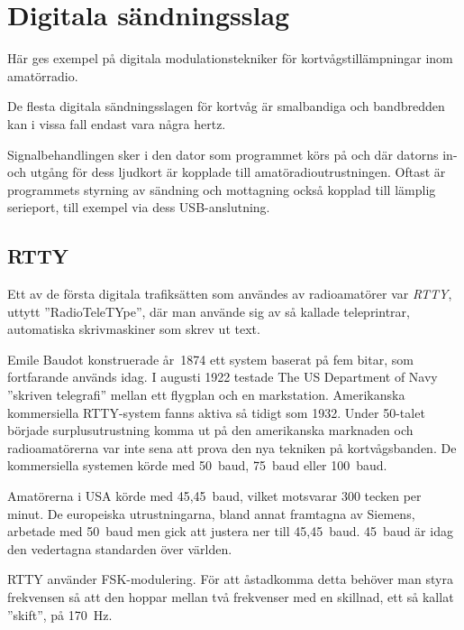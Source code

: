 \section{Digitala sändningsslag}

Här ges exempel på digitala modulationstekniker för kortvågstillämpningar inom
amatörradio.

De flesta digitala sändningsslagen för kortvåg är smalbandiga och bandbredden
kan i vissa fall endast vara några hertz.

Signalbehandlingen sker i den dator som programmet körs på och där datorns
in- och utgång för dess ljudkort är kopplade till amatöradioutrustningen.
Oftast är programmets styrning av sändning och mottagning också kopplad till
lämplig serieport, till exempel via dess USB-anslutning.

\subsection{RTTY}

\begin{historiabox}
Ett av de första digitala trafiksätten som användes av radioamatörer var
\emph{RTTY}, uttytt ''RadioTeleTYpe'', där man använde sig av så kallade
teleprintrar, automatiska skrivmaskiner som skrev ut text.

Emile Baudot konstruerade år~1874 ett system baserat på fem bitar,
som fortfarande används idag.
I augusti 1922 testade The US Department of Navy ''skriven telegrafi'' mellan
ett flygplan och en markstation.
Amerikanska kommersiella RTTY-system fanns aktiva så tidigt som 1932.
Under 50-talet började surplusutrustning komma ut på den amerikanska
marknaden och radioamatörerna var inte sena att prova den nya tekniken på
kortvågsbanden.
De kommersiella systemen körde med 50~baud, 75~baud eller 100~baud.

Amatörerna i USA körde med 45,45~baud, vilket motsvarar 300 tecken per minut.
De europeiska utrustningarna, bland annat framtagna av Siemens, arbetade med
50~baud men gick att justera ner till 45,45~baud.
45~baud är idag den vedertagna standarden över världen.
\end{historiabox}

RTTY använder FSK-modulering.
För att åstadkomma detta behöver man styra frekvensen så att den hoppar mellan
två frekvenser med en skillnad, ett så kallat ''skift'', på \qty{170}{\hertz}.

